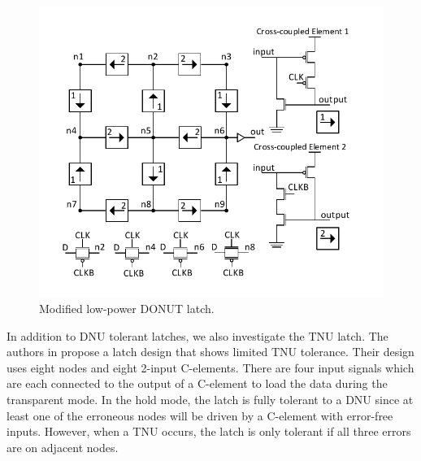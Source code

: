 \begin{figure}[!htbp]
	\centering
	\includegraphics[trim = 0mm 5mm 0mm 7mm, clip, width=\linewidth]{Figures/ModDONUT}
	\caption{Modified low-power DONUT latch.}
	\label{DONUT_M}
\end{figure}

In addition to DNU tolerant latches, we also investigate the TNU latch. The authors in \cite{Blum2007} propose a latch design that shows limited TNU tolerance. Their design uses eight nodes and eight 2-input C-elements. There are four input signals which are each connected to the output of a C-element to load the data during the transparent mode. In the hold mode, the latch is fully tolerant to a DNU since at least one of the erroneous nodes will be driven by a C-element with error-free inputs. However, when a TNU occurs, the latch is only tolerant if all three errors are on adjacent nodes. 